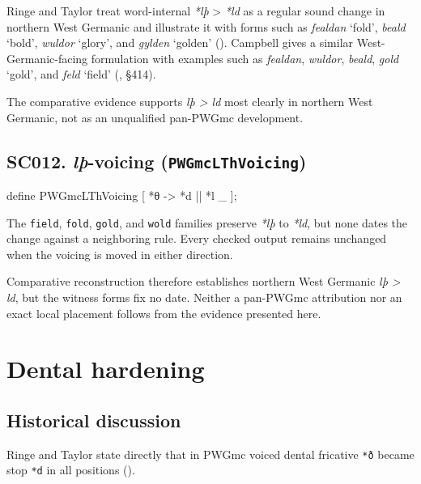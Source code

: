 \documentclass[
  british,
  a4paper,
  openany]{book}
\newcounter{none} %
\providecommand{\texorpdfstring}[2]{#1}
\begin{document}
Ringe and Taylor treat word-internal \emph{*lþ} \textgreater{}
\emph{*ld} as a regular sound change in northern West Germanic and
illustrate it with forms such as \emph{fealdan} `fold', \emph{beald}
`bold', \emph{wuldor} `glory', and \emph{gylden} `golden'
().
Campbell gives a similar West-Germanic-facing formulation with examples
such as \emph{fealdan}, \emph{wuldor}, \emph{beald}, \emph{gold} `gold',
and \emph{feld} `field' (, §414).

The comparative evidence supports \emph{lþ > ld} most clearly in
northern West Germanic, not as an unqualified pan-PWGmc development.

\subsection{\texorpdfstring{SC012. \emph{lþ}-voicing
(\texttt{PWGmcLThVoicing})}{SC012. -voicing (PWGmcLThVoicing)}}\label{rule-PWGmcLThVoicing}

\begin{ReaderFacingFoma}
define PWGmcLThVoicing [
    {*θ} -> {*d} || {*l} _
];
\end{ReaderFacingFoma}

The \texttt{field}, \texttt{fold}, \texttt{gold}, and \texttt{wold}
families preserve \emph{*lþ} to \emph{*ld}, but none dates the change
against a neighboring rule. Every checked output remains unchanged when
the voicing is moved in either direction.

Comparative reconstruction therefore establishes northern West Germanic
\emph{lþ > ld}, but the witness forms fix no date. Neither a pan-PWGmc
attribution nor an exact local placement follows from the evidence
presented here.

\newpage

\section{Dental hardening}\label{dental-hardening}

\subsection{Historical discussion}\label{historical-discussion-10}

Ringe and Taylor state directly that in PWGmc voiced dental fricative
\texttt{*ð} became stop \texttt{*d} in all positions
().
\end{document}

